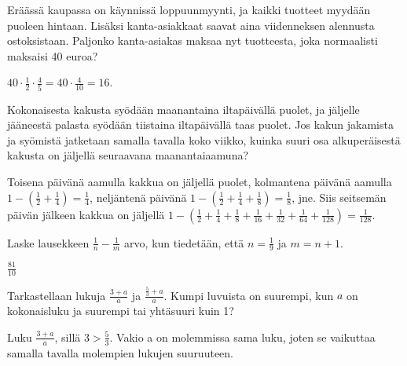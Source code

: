 \begin{tehtavasivu}
\begin{tehtava}
	Eräässä kaupassa on käynnissä loppuunmyynti, ja kaikki tuotteet
    myydään puoleen hintaan. Lisäksi kanta-asiakkaat saavat aina
    viidenneksen alennusta ostoksistaan. Paljonko kanta-asiakas maksaa nyt tuotteesta, joka normaalisti
    maksaisi 40 euroa?
    \begin{vastaus}
		$40\cdot \frac{1}{2} \cdot \frac{4}{5}=40\cdot \frac{4}{10}= 16$. 
	\end{vastaus}
\end{tehtava}
    
\begin{tehtava}
	Kokonaisesta kakusta syödään maanantaina iltapäivällä puolet, ja jäljelle
	jääneestä palasta syödään tiistaina iltapäivällä taas puolet.
	Jos kakun jakamista ja syömistä jatketaan samalla tavalla koko viikko,
	kuinka suuri osa alkuperäisestä kakusta on
	jäljellä seuraavana maanantaiaamuna?
	\begin{vastaus}
		Toisena päivänä aamulla kakkua on jäljellä puolet, kolmantena
		päivänä aamulla
		$1-\left(\frac{1}{2} + \frac{1}{4}\right) = \frac{1}{4}$, 
		neljäntenä päivänä
		$1-\left(\frac{1}{2} + \frac{1}{4} + \frac{1}{8}\right)
		= \frac{1}{8}$, jne.
		Siis seitsemän päivän jälkeen kakkua on jäljellä
		$1-\left(\frac{1}{2} + \frac{1}{4} + \frac{1}{8} +
		\frac{1}{16} + \frac{1}{32} + \frac{1}{64} + \frac{1}{128}\right)
		= \frac{1}{128}$.  
	\end{vastaus}
\end{tehtava}

\begin{tehtava}
	Laske lausekkeen $\frac{1}{n}-\frac{1}{m}$ arvo, kun tiedetään, että $n = \frac{1}{9}$ ja $m=n+1$.
	\begin{vastaus}
		$\frac{81}{10}$
	\end{vastaus}
\end{tehtava}

\begin{tehtava}
 Tarkastellaan lukuja $\frac{3+a}{a}$ ja $\frac{\frac{5}{3}+a}{a}$. Kumpi luvuista on suurempi, kun \(a\) on kokonaisluku ja suurempi tai yhtäsuuri kuin 1?
 \begin{vastaus}
  Luku $\frac{3+a}{a}$, sillä $3>\frac{5}{3}$. Vakio a on molemmissa sama luku, joten se vaikuttaa samalla tavalla molempien lukujen suuruuteen.
 \end{vastaus}
\end{tehtava}


\end{tehtavasivu}
